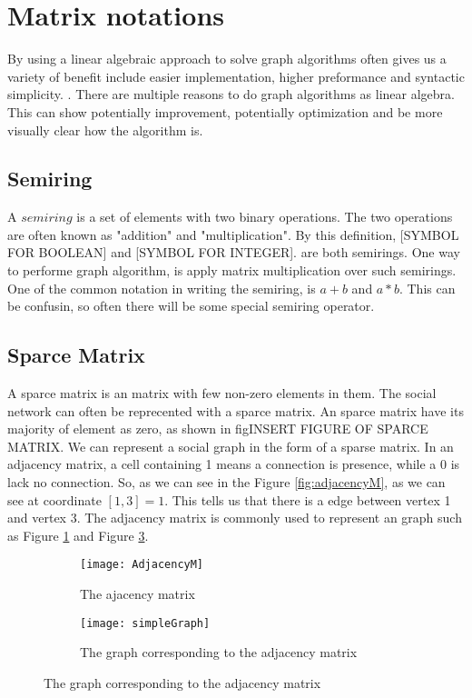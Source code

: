 \section{Matrix notations}
By using a linear algebraic approach to solve graph algorithms often gives us a variety of benefit include easier implementation, higher preformance and syntactic simplicity. \cite{MathToAlgo}. There are multiple reasons to do graph algorithms as linear algebra. This can show potentially improvement, potentially optimization and be more visually clear how the algorithm is. 


\subsection{Semiring}
A $semiring$ is a set of elements with two binary operations. The two operations are often known as "addition" and "multiplication". By this definition, [SYMBOL FOR BOOLEAN] and [SYMBOL FOR INTEGER]. are both semirings.  One way to performe graph algorithm, is apply matrix multiplication over such semirings. One of the common notation in writing the semiring, is $a+b$ and $a \ast b$. This can be confusin, so often there will be some special semiring operator.

\subsection{Sparce Matrix}
A sparce matrix is an matrix with few non-zero elements in them. The social network can often be reprecented with a sparce matrix. An sparce matrix have its majority of element as zero, as shown in fig{INSERT FIGURE OF SPARCE MATRIX}. We can represent a social graph in the form of a sparse matrix. In an adjacency matrix, a cell containing 1 means a connection is presence, while a 0 is lack no connection. So, as we can see in the Figure \ref{fig:adjacencyM}, as we can see at coordinate $[1,3] = 1$. This tells us that there is a edge between vertex 1 and vertex 3. The adjacency matrix is commonly used to represent an graph such as Figure \ref{fig:AdjacencyM} and Figure \ref{fig:matrix}.

\begin{figure}
	\begin{subfigure}{0.5\textwidth}
	\texttt{[image: AdjacencyM]}
	\caption{The ajacency matrix}
	\label{fig:AdjacencyM}
	\end{subfigure}


	\begin{subfigure}{0.5\textwidth}
	\texttt{[image: simpleGraph]}
	\caption{The graph corresponding to the adjacency matrix}
	\label{fig:matrix}
	\end{subfigure}
	 	
\end{figure}

